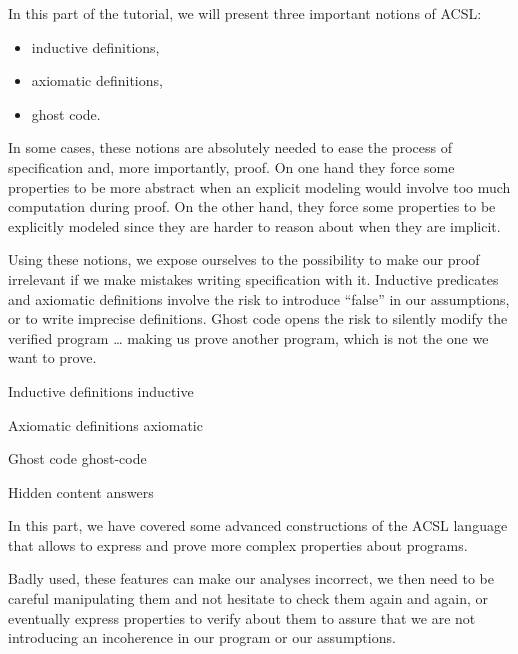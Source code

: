 In this part of the tutorial, we will present three important notions of ACSL:

\begin{itemize}
\item inductive definitions,
\item axiomatic definitions,
\item ghost code.
\end{itemize}


In some cases, these notions are absolutely needed to ease the process of
specification and, more importantly, proof. On one hand they force some
properties to be more abstract when an explicit modeling would involve too much
computation during proof. On the other hand, they force some properties to be
explicitly modeled since they are harder to reason about when they are implicit.

Using these notions, we expose ourselves to the possibility to make our
proof irrelevant if we make mistakes writing specification with it. Inductive
predicates and axiomatic definitions involve the risk to introduce ``false'' in
our assumptions, or to write imprecise definitions. Ghost code opens the risk
to silently modify the verified program \ldots{} making us prove another program,
which is not the one we want to prove.


\begin{levelTwo}
  {Inductive definitions}
  {inductive}
\end{levelTwo}

\begin{levelTwo}
  {Axiomatic definitions}
  {axiomatic}
\end{levelTwo}

\begin{levelTwo}
  {Ghost code}
  {ghost-code}
\end{levelTwo}

\begin{levelTwo}
  {Hidden content}
  {answers}
\end{levelTwo}


\horizontalLine
\newpage


In this part, we have covered some advanced constructions of the ACSL
language that allows to express and prove more complex properties about
programs.

Badly used, these features can make our analyses incorrect, we then need
to be careful manipulating them and not hesitate to check them again and
again, or eventually express properties to verify about them to assure
that we are not introducing an incoherence in our program or our
assumptions.
